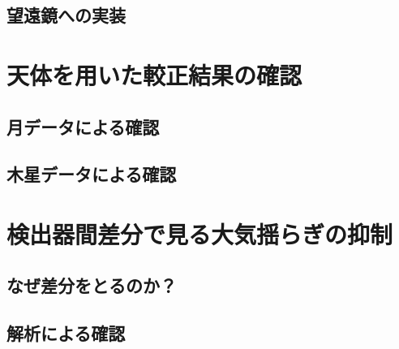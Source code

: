 \subsection{望遠鏡への実装}

\section{天体を用いた較正結果の確認}

\subsection{月データによる確認}

\subsection{木星データによる確認}

\section{検出器間差分で見る大気揺らぎの抑制}

\subsection{なぜ差分をとるのか？}

\subsection{解析による確認}
